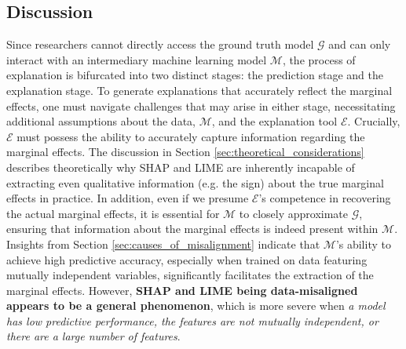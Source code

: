 \documentclass[mnsc,blindrev]{informs3}
\begin{document}
    \subsection{Discussion}
            Since researchers cannot directly access the ground truth model $\mathcal{G}$ and can only interact with an intermediary machine learning model $\mathcal{M}$, the process of explanation is bifurcated into two distinct stages: the prediction stage and the explanation stage. To generate explanations that accurately reflect the marginal effects, one must navigate challenges that may arise in either stage, necessitating additional assumptions about the data, $\mathcal{M}$, and the explanation tool $\mathcal{E}$. Crucially, $\mathcal{E}$ must possess the ability to accurately capture information regarding the marginal effects. The discussion in Section \ref{sec:theoretical_considerations} describes theoretically why SHAP and LIME are inherently incapable of extracting even qualitative information (e.g. the sign) about the true marginal effects in practice. In addition, even if we presume $\mathcal{E}$'s competence in recovering the actual marginal effects, it is essential for $\mathcal{M}$ to closely approximate $\mathcal{G}$, ensuring that information about the marginal effects is indeed present within $\mathcal{M}$. Insights from Section \ref{sec:causes_of_misalignment} indicate that $\mathcal{M}$'s ability to achieve high predictive accuracy, especially when trained on data featuring mutually independent variables, significantly facilitates the extraction of the marginal effects. However, \textbf{SHAP and LIME being data-misaligned appears to be a general phenomenon}, which is more severe when \textit{a model has low predictive performance, the features are not mutually independent, or there are a large number of features}. 


\end{document}
